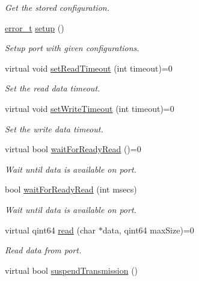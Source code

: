 \begin{DoxyCompactItemize}
\begin{DoxyCompactList}\small\item\em Get the stored configuration. \end{DoxyCompactList}\item 
\hyperlink{classmdt_abstract_port_ad4121bb930c95887e77f8bafa065a85e}{error\_\-t} \hyperlink{classmdt_abstract_port_abc9f1154ac71c4e31ac3e7a3ff4c5182}{setup} ()
\begin{DoxyCompactList}\small\item\em Setup port with given configurations. \end{DoxyCompactList}\item 
virtual void \hyperlink{classmdt_abstract_port_a6589b04467e0073d18ba872201bdcd84}{setReadTimeout} (int timeout)=0
\begin{DoxyCompactList}\small\item\em Set the read data timeout. \end{DoxyCompactList}\item 
virtual void \hyperlink{classmdt_abstract_port_a12eb422d52ebb09a650f8497b258c2e7}{setWriteTimeout} (int timeout)=0
\begin{DoxyCompactList}\small\item\em Set the write data timeout. \end{DoxyCompactList}\item 
virtual bool \hyperlink{classmdt_abstract_port_a848e3c86aa6ec480e8c471655fbcf5c5}{waitForReadyRead} ()=0
\begin{DoxyCompactList}\small\item\em Wait until data is available on port. \end{DoxyCompactList}\item 
bool \hyperlink{classmdt_abstract_port_ae77785fbad938eac5f24f437e7683277}{waitForReadyRead} (int msecs)
\begin{DoxyCompactList}\small\item\em Wait until data is available on port. \end{DoxyCompactList}\item 
virtual qint64 \hyperlink{classmdt_abstract_port_a9d9c45220d5328c9856a2445557fe970}{read} (char $\ast$data, qint64 maxSize)=0
\begin{DoxyCompactList}\small\item\em Read data from port. \end{DoxyCompactList}\item 
virtual bool \hyperlink{classmdt_abstract_port_aff3d79248baf96e670eba6d2fef700b9}{suspendTransmission} ()

\end{DoxyCompactItemize}
